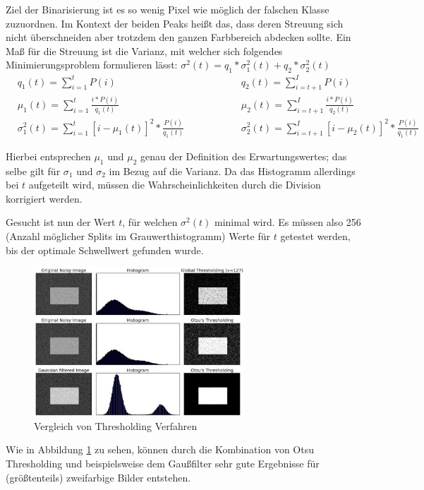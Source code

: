 \documentclass[a4paper, oneside, 12pt]{article}
\begin{document}
Ziel der Binarisierung ist es so wenig Pixel wie möglich der falschen Klasse zuzuordnen. Im Kontext der beiden Peaks heißt das, dass deren Streuung sich nicht überschneiden aber trotzdem den ganzen Farbbereich abdecken sollte. Ein Maß für die Streuung ist die Varianz, mit welcher sich folgendes Minimierungsproblem formulieren lässt: $\sigma^2(t) = q_1 * \sigma^2_1(t) + q_2 * \sigma^2_2(t)$
\begin{align*}
	&q_1(t) = \sum_{i=1}^{t} P(i)
	&&q_2(t) = \sum_{i=t+1}^{I} P(i)\\
	&\mu_1(t) = \sum_{i=1}^{t} \frac{i * P(i)}{q_1(t)}
	&&\mu_2(t) = \sum_{i=t+1}^{I} \frac{i * P(i)}{q_2(t)}\\
	&\sigma^2_1(t) = \sum_{i=1}^{t} [i - \mu_1(t)]^2 * \frac{P(i)}{q_1(t)} \hspace{50pt}
	&&\sigma^2_2(t) = \sum_{i=t+1}^{I} [i - \mu_2(t)]^2 * \frac{P(i)}{q_1(t)}
\end{align*}

Hierbei entsprechen $\mu_1$ und $\mu_2$ genau der Definition des Erwartungswertes; das selbe gilt für $\sigma_1$ und $\sigma_2$ im Bezug auf die Varianz. Da das Histogramm allerdings bei $t$ aufgeteilt wird, müssen die Wahrscheinlichkeiten durch die Division korrigiert werden.

Gesucht ist nun der Wert $t$, für welchen $\sigma^2(t)$ minimal wird. Es müssen also 256 (Anzahl möglicher Splits im Grauwerthistogramm) Werte für $t$ getestet werden, bis der optimale Schwellwert gefunden wurde.

\begin{figure}[h]
	\centering
	\includegraphics[width=0.7\textwidth]{images/otsu.jpg}
	\caption{Vergleich von Thresholding Verfahren \cite{img:thresholding}}
	\label{fig:otsu}
\end{figure}

Wie in Abbildung \ref{fig:otsu} zu sehen, können durch die Kombination von Otsu Thresholding und beispielsweise dem Gaußfilter sehr gute Ergebnisse für (größtenteils) zweifarbige Bilder entstehen. 
\end{document}
